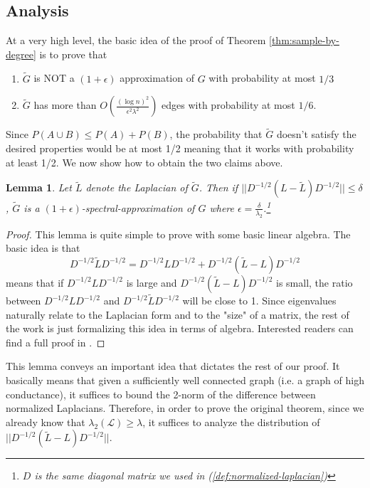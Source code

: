 \documentclass[12pt,twoside]{article}
\newtheorem{lemma}[thm]{Lemma}
\begin{document}
\subsection{Analysis}

At a very high level, the basic idea of the proof of Theorem \ref{thm:sample-by-degree} is to prove that 

\begin{enumerate}
    \item $\tilde{G}$ is NOT a $(1 + \epsilon)$ approximation of $G$ with probability at most $1/3$
    \item $\tilde{G}$ has more than $O\left(\frac{(\log n)^2}{\epsilon^2\lambda^2}\right)$ edges with probability at most $1/6$.
\end{enumerate}

Since $P(A \cup B) \leq P(A) + P(B)$, the probability that $\tilde{G}$ doesn't satisfy the desired properties would be at most 1/2 meaning that it works with probability at least 1/2. We now show how to obtain the two claims above. 

\begin{lemma}
Let $\tilde{L}$ denote the Laplacian of $\tilde{G}$. Then if $||D^{-1/2}(L-\tilde{L})D^{-1/2}|| \leq \delta$, $\tilde{G}$ is a $(1+\epsilon)$-spectral-approximation of $G$ where $\epsilon = \frac{\delta}{\lambda_2}$.\footnote{$D$ is the same diagonal matrix we used in (\ref{def:normalized-laplacian})}
\end{lemma}

\begin{proof}
This lemma is quite simple to prove with some basic linear algebra. The basic idea is that 
%
\begin{equation*}
D^{-1/2}\tilde{L}D^{-1/2} = D^{-1/2}LD^{-1/2} + D^{-1/2}(\tilde{L} - L)D^{-1/2}
\end{equation*}
%
means that if $D^{-1/2}LD^{-1/2}$ is large and $D^{-1/2}(\tilde{L} - L)D^{-1/2}$ is small, the ratio between $D^{-1/2}LD^{-1/2}$ and $D^{-1/2}\tilde{L}D^{-1/2}$ will be close to 1. Since eigenvalues naturally relate to the Laplacian form and to the "size" of a matrix, the rest of the work is just formalizing this idea in terms of algebra. Interested readers can find a full proof in \cite{spielman-teng-spectralsparse}.

\end{proof}

This lemma conveys an important idea that dictates the rest of our proof. It basically means that given a sufficiently well connected graph (i.e. a graph of high conductance), it suffices to bound the 2-norm of the difference between normalized Laplacians. Therefore, in order to prove the original theorem, since we already know that $\lambda_2(\mathcal{L}) \geq \lambda$, it suffices to analyze the distribution of $||D^{-1/2}(\tilde{L} - L)D^{-1/2}||$. 
\end{document}
